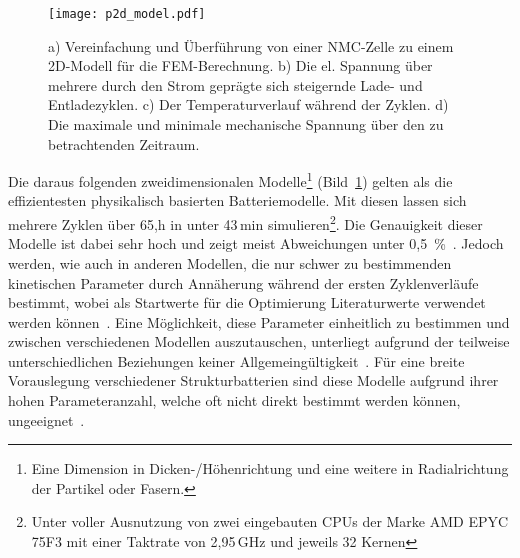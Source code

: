 \begin{figure}[!h]
        \center
		\texttt{[image: p2d\_model.pdf]}
		\caption{\label{fig:p2d_model}a) Vereinfachung und Überführung von einer NMC-Zelle zu einem 2D-Modell für die FEM-Berechnung. b) Die el. Spannung über mehrere durch den Strom geprägte sich steigernde Lade- und Entladezyklen. c) Der Temperaturverlauf während der Zyklen. d) Die maximale und minimale mechanische Spannung über den zu betrachtenden Zeitraum.
        }
\end{figure}

Die daraus folgenden zweidimensionalen Modelle\footnote{Eine Dimension in Dicken-/Höhenrichtung und eine weitere in Radialrichtung der Partikel oder Fasern.} (Bild~\ref{fig:p2d_model}) gelten als die effizientesten physikalisch basierten Batteriemodelle. Mit diesen lassen sich mehrere Zyklen über 65,h in unter 43\,min simulieren\footnote{Unter voller Ausnutzung von zwei eingebauten CPUs der Marke AMD EPYC 75F3 mit einer Taktrate von 2,95\,GHz und jeweils 32 Kernen}. Die Genauigkeit dieser Modelle ist dabei sehr hoch und zeigt meist Abweichungen unter 0,5~\%~\cite{Pistorio2023}. Jedoch werden, wie auch in anderen Modellen, die nur schwer zu bestimmenden kinetischen Parameter durch Annäherung während der ersten Zyklenverläufe bestimmt, wobei als Startwerte für die Optimierung Literaturwerte verwendet werden können~\cite{Sauerteig2018,Shui2023}. Eine Möglichkeit, diese Parameter einheitlich zu bestimmen und zwischen verschiedenen Modellen auszutauschen, unterliegt aufgrund der teilweise unterschiedlichen Beziehungen keiner Allgemeingültigkeit~\cite{Madani2018}. Für eine breite Vorauslegung verschiedener Strukturbatterien sind diese Modelle aufgrund ihrer hohen Parameteranzahl, welche oft nicht direkt bestimmt werden können, ungeeignet~\cite{Li2022}.


